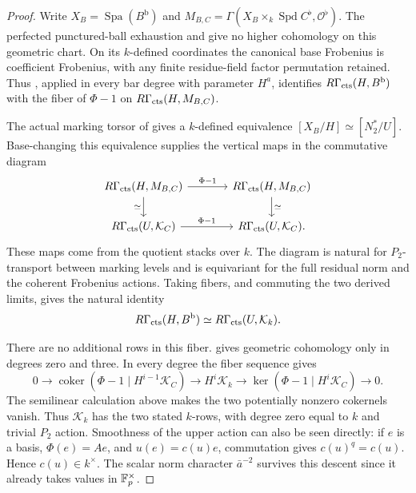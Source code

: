 \begin{proof}
Write $X_B=\operatorname{Spa}(B^{\mathrm b})$ and
$M_{B,C}=\Gamma(X_B\times_k\operatorname{Spd}C^\flat,
\mathcal O^\flat)$.  The perfected punctured-ball
exhaustion and  give no
higher cohomology on this geometric chart.  On its
$k$-defined coordinates the canonical base Frobenius
is coefficient Frobenius, with any finite residue-field
factor permutation retained.  Thus
, applied in every bar degree
with parameter $H^a$, identifies
$R\Gamma_{\mathrm{cts}}(H,B^{\mathrm b})$ with the fiber of
$\Phi-1$ on $R\Gamma_{\mathrm{cts}}(H,M_{B,C})$.

The actual marking torsor of
 gives a $k$-defined
equivalence $[X_B/H]\simeq[N_2^*/U]$.
Base-changing this equivalence supplies the vertical
maps in the commutative diagram
\begin{equation}\label{h3:ana:frobenius-square}
\begin{tikzcd}[column sep=large]
 R\Gamma_{\hthreects}(H,M_{B,C})
   \arrow[r,"\Phi-1"]\arrow[d,"\simeq"']
 &R\Gamma_{\hthreects}(H,M_{B,C})\arrow[d,"\simeq"]\\
 R\Gamma_{\hthreects}(U,\mathcal K_C)\arrow[r,"\Phi-1"]
 &R\Gamma_{\hthreects}(U,\mathcal K_C).
\end{tikzcd}
\end{equation}
These maps come from the quotient stacks over $k$.
The diagram is natural for $P_2$-transport between
marking levels and is equivariant for the full
residual norm and the coherent Frobenius actions.
Taking fibers, and commuting the two derived limits,
gives the natural identity
\[
 R\Gamma_{\mathrm{cts}}(H,B^{\mathrm b})
      \simeq R\Gamma_{\mathrm{cts}}(U,\mathcal K_k).
\]

There are no additional rows in this fiber.
 gives geometric
cohomology only in degrees zero and three.  In every
degree the fiber sequence gives
\[
 0\longrightarrow
 \operatorname{coker}(\Phi-1\mid H^{i-1}\mathcal K_C)
 \longrightarrow H^i\mathcal K_k
 \longrightarrow
 \ker(\Phi-1\mid H^i\mathcal K_C)
 \longrightarrow0.
\]
The semilinear calculation above makes the two
potentially nonzero cokernels vanish.  Thus
$\mathcal K_k$ has the two stated $k$-rows, with
degree zero equal to $k$ and trivial $P_2$ action.
Smoothness of the upper action can also be seen
directly: if $e$ is a basis, $\Phi(e)=Ae$, and
$u(e)=c(u)e$, commutation gives
$c(u)^q=c(u)$.  Hence $c(u)\in k^\times$.
The scalar norm character $\bar a^{-2}$ survives
this descent since it already takes values in
$\mathbb F_p^\times$.


\end{proof}
